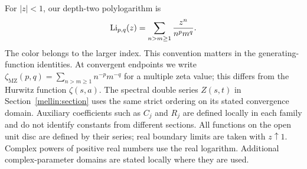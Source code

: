 For $|z|<1$, our depth-two polylogarithm is
\begin{equation}\label{eq:depth-two-convention}
 \operatorname{Li}_{p,q}(z)=\sum_{n>m\geq1}\frac{z^n}{n^p m^q}.
\end{equation}
The color belongs to the larger index. This convention matters in the
generating-function identities. At convergent endpoints we write
$\zeta_{\mathrm{MZ}}(p,q)=\sum_{n>m\geq1}n^{-p}m^{-q}$ for a
multiple zeta value; this differs from the Hurwitz function $\zeta(s,a)$.
The spectral double series $Z(s,t)$ in Section~\ref{mellin:section}
uses the same strict ordering on its stated convergence domain.
Auxiliary coefficients such as $C_j$ and $R_j$ are defined locally in
each family and do not identify constants from different sections.
All functions on the open unit disc are
defined by their series; real boundary limits are taken with $z\uparrow1$.
Complex powers of positive real numbers use the real logarithm. Additional
complex-parameter domains are stated locally where they are used.
